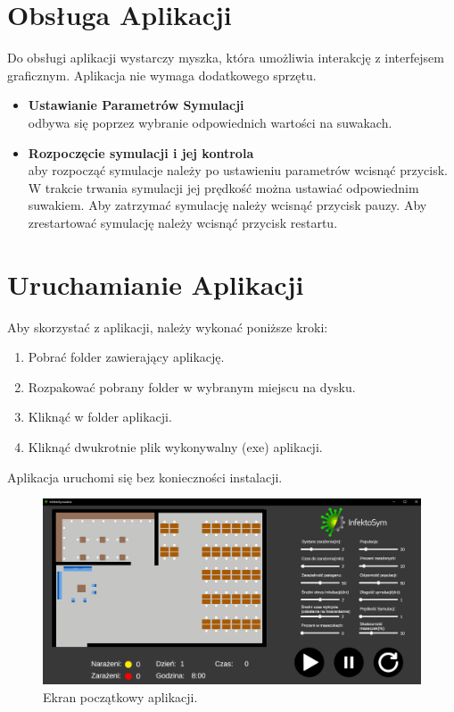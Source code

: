 \section{Obsługa Aplikacji}

Do obsługi aplikacji wystarczy myszka, która umożliwia interakcję z interfejsem graficznym. Aplikacja nie wymaga dodatkowego sprzętu.
\begin{itemize}
	\item \textbf{Ustawianie Parametrów Symulacji}\\
			odbywa się poprzez wybranie odpowiednich wartości na suwakach.
	\item \textbf{Rozpoczęcie symulacji i jej kontrola}\\
			aby rozpocząć symulacje należy po ustawieniu parametrów wcisnąć przycisk. W trakcie trwania symulacji jej prędkość można ustawiać odpowiednim suwakiem. Aby zatrzymać symulację należy wcisnąć przycisk pauzy. Aby zrestartować symulację należy wcisnąć przycisk restartu.
\end{itemize}

\section{Uruchamianie Aplikacji}

Aby skorzystać z aplikacji, należy wykonać poniższe kroki:

\begin{enumerate}
	\item Pobrać folder zawierający aplikację.
	\item Rozpakować pobrany folder w wybranym miejscu na dysku.
	\item Kliknąć w folder aplikacji.
	\item Kliknąć dwukrotnie plik wykonywalny (exe) aplikacji.
\end{enumerate}

Aplikacja uruchomi się bez konieczności instalacji.

\begin{figure}[h!]
	\includegraphics[width=\linewidth]{beforeSim.png}
	\caption{Ekran początkowy aplikacji.}
\end{figure}

